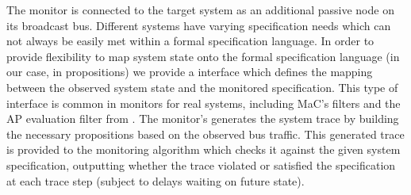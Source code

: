 The monitor is connected to the target system as an additional passive node on its broadcast bus.
Different systems have varying specification needs which can not always be easily met within a formal specification language.
In order to provide flexibility to map system state onto the formal specification language (in our case, in propositions) we provide a \sfmap interface which defines the mapping between the observed system state and the monitored specification.
This type of interface is common in monitors for real systems, including MaC's filters \cite{Kim2004} and the AP evaluation filter from \cite{Heffernan2014}.
The monitor's \sfmap generates the system trace by building the necessary propositions based on the observed bus traffic.
This generated trace is provided to the monitoring algorithm which checks it against the given system specification, outputting whether the trace violated or satisfied the specification at each trace step (subject to delays waiting on future  state).


